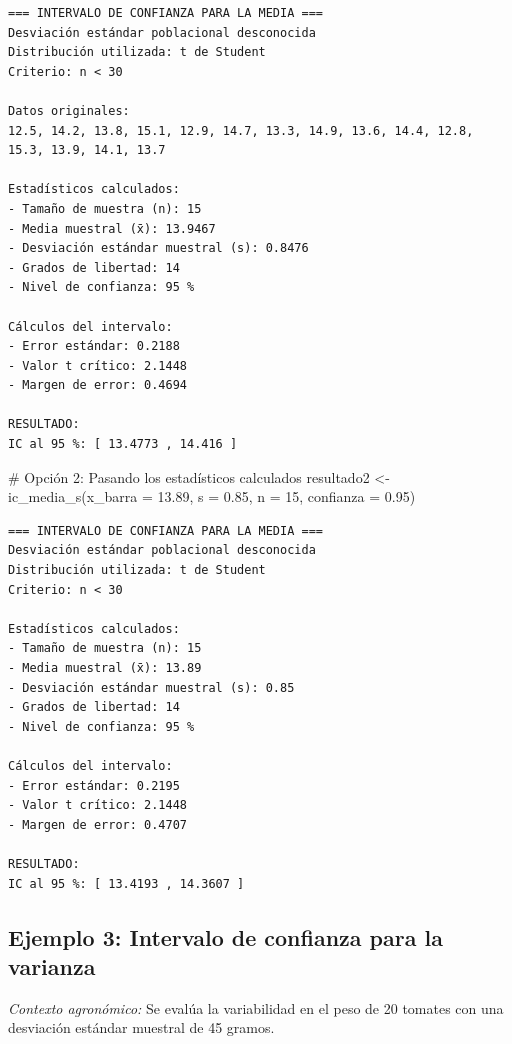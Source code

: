 \documentclass[
  spanish,
  letterpaper,
]{book}
\newenvironment{Shaded}{\begin{snugshade}}{\end{snugshade}}
\newcommand{\AttributeTok}[1]{\textcolor[rgb]{0.40,0.45,0.13}{#1}}
\newcommand{\CommentTok}[1]{\textcolor[rgb]{0.37,0.37,0.37}{#1}}
\newcommand{\DecValTok}[1]{\textcolor[rgb]{0.68,0.00,0.00}{#1}}
\newcommand{\FloatTok}[1]{\textcolor[rgb]{0.68,0.00,0.00}{#1}}
\newcommand{\FunctionTok}[1]{\textcolor[rgb]{0.28,0.35,0.67}{#1}}
\newcommand{\NormalTok}[1]{\textcolor[rgb]{0.00,0.23,0.31}{#1}}
\newcommand{\OtherTok}[1]{\textcolor[rgb]{0.00,0.23,0.31}{#1}}
\begin{document}
\begin{verbatim}
=== INTERVALO DE CONFIANZA PARA LA MEDIA ===
Desviación estándar poblacional desconocida
Distribución utilizada: t de Student 
Criterio: n < 30

Datos originales:
12.5, 14.2, 13.8, 15.1, 12.9, 14.7, 13.3, 14.9, 13.6, 14.4, 12.8, 15.3, 13.9, 14.1, 13.7 

Estadísticos calculados:
- Tamaño de muestra (n): 15 
- Media muestral (x̄): 13.9467 
- Desviación estándar muestral (s): 0.8476 
- Grados de libertad: 14 
- Nivel de confianza: 95 %

Cálculos del intervalo:
- Error estándar: 0.2188 
- Valor t crítico: 2.1448 
- Margen de error: 0.4694 

RESULTADO:
IC al 95 %: [ 13.4773 , 14.416 ]
\end{verbatim}

\begin{Shaded}
\begin{Highlighting}[]
\CommentTok{\# Opción 2: Pasando los estadísticos calculados}
\NormalTok{resultado2 }\OtherTok{\textless{}{-}} \FunctionTok{ic\_media\_s}\NormalTok{(}\AttributeTok{x\_barra =} \FloatTok{13.89}\NormalTok{, }\AttributeTok{s =} \FloatTok{0.85}\NormalTok{, }\AttributeTok{n =} \DecValTok{15}\NormalTok{, }\AttributeTok{confianza =} \FloatTok{0.95}\NormalTok{)}
\end{Highlighting}
\end{Shaded}

\begin{verbatim}
=== INTERVALO DE CONFIANZA PARA LA MEDIA ===
Desviación estándar poblacional desconocida
Distribución utilizada: t de Student 
Criterio: n < 30

Estadísticos calculados:
- Tamaño de muestra (n): 15 
- Media muestral (x̄): 13.89 
- Desviación estándar muestral (s): 0.85 
- Grados de libertad: 14 
- Nivel de confianza: 95 %

Cálculos del intervalo:
- Error estándar: 0.2195 
- Valor t crítico: 2.1448 
- Margen de error: 0.4707 

RESULTADO:
IC al 95 %: [ 13.4193 , 14.3607 ]
\end{verbatim}

\subsection{Ejemplo 3: Intervalo de confianza para la
varianza}\label{ejemplo-3-intervalo-de-confianza-para-la-varianza}

\emph{Contexto agronómico:} Se evalúa la variabilidad en el peso de 20
tomates con una desviación estándar muestral de 45 gramos.
\end{document}
